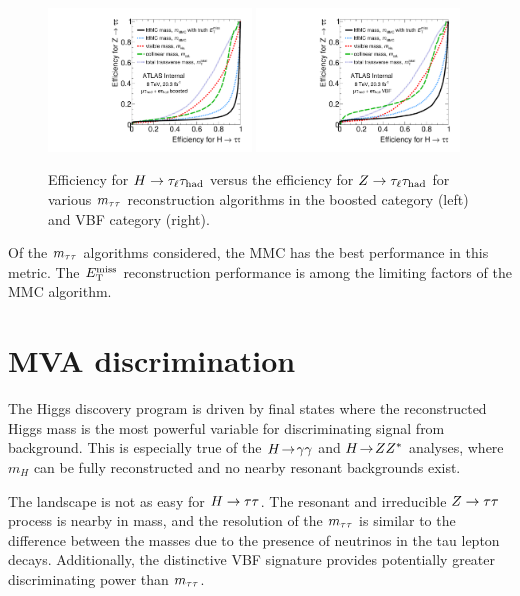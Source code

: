\begin{figure}[tp]
  \centering
  \includegraphics[width=0.48\textwidth]{figures/mtautau/mtautau-boost}
  \includegraphics[width=0.48\textwidth]{figures/mtautau/mtautau-vbf}
  \caption{Efficiency for $H\rightarrow\tau_\ell\tau_\text{had}$ versus the efficiency for $Z\rightarrow\tau_\ell\tau_\text{had}$ for various $m_{\tau\tau}$ reconstruction algorithms in the boosted category (left) and VBF category (right).}
  \label{fig:strategy-mtautau-ROC}
\end{figure}

Of the $m_{\tau\tau}$ algorithms considered, the MMC has the best performance in this metric. The $E_{\mathrm{T}}^{\mathrm{miss}}$ reconstruction performance is among the limiting factors of the MMC algorithm.

\section{MVA discrimination}
\label{sec:strategy-mva}

The Higgs discovery program is driven by final states where the reconstructed Higgs mass is the most powerful variable for discriminating signal from background. This is especially true of the $H \!\rightarrow\! \gamma\gamma$ and $H \!\rightarrow\! ZZ^\ast$ analyses, where $m_H$ can be fully reconstructed and no nearby resonant backgrounds exist.

The landscape is not as easy for $H\rightarrow\tau\tau$. The resonant and irreducible $Z\rightarrow\tau\tau$ process is nearby in mass, and the resolution of the $m_{\tau\tau}$ is similar to the difference between the masses due to the presence of neutrinos in the tau lepton decays. Additionally, the distinctive VBF signature provides potentially greater discriminating power than $m_{\tau\tau}$.

